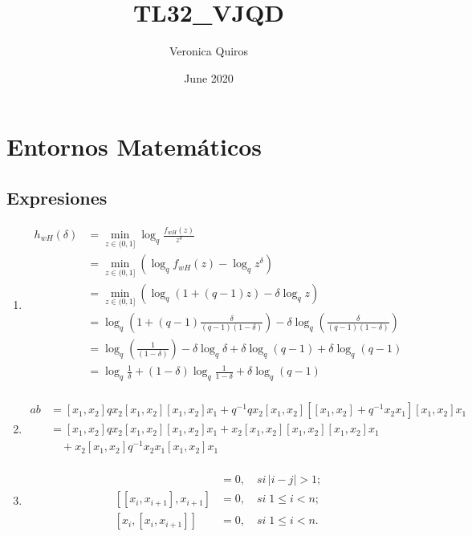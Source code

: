 \documentclass[12pt]{article}
\title{TL32\_VJQD}
\author{Veronica Quiros}
\date{June 2020}
\begin{document}
\maketitle
 \section{Entornos Matem\'aticos}
 \subsection{Expresiones}
 \begin{enumerate}
     \item 
     \begin{align*}
        h_{wH}(\delta)&= \min\limits_{z\in(0,1]} \log_q \frac{f_{wH} (z)}{z^\delta}\\
        & =\min\limits_{z\in(0,1]} (\log_q {f_{wH} (z)}-\log_{q} {z^\delta})\\
        &=\min\limits_{z\in(0,1]}(\log_{q} (1+(q-1)z) -\delta\log_{q} z)\\
        &=\log_{q} \left(1+(q-1)\frac{\delta}{(q-1)(1-\delta)}\right)-\delta\log_{q} \left(\frac{\delta}{(q-1)(1-\delta)}\right)\\
        &=\log_{q} \left(\frac{1}{(1-\delta)}\right) - \delta\log_{q} \delta +\delta\log_{q} (q-1) +\delta\log_{q} (q-1)\\ 
        &=\log_{q} \frac{1}{\delta} +(1-\delta)\log_{q} \frac{1}{1-\delta}+\delta\log_{q} (q-1)\\
     \end{align*}
     \item
     \begin{align*}
         ab&=[x_{1},x_{2}]qx_{2}[x_{1},x_{2}][x_{1},x_{2}]x_{1}+q^{-1}qx_{2}[x_{1},x_{2}][[x_{1},x_{2}]+ q^{-1}x_{2}x_{1}][x_{1},x_{2}]x_{1}\\
         &=[x_{1},x_{2}]qx_{2}[x_{1},x_{2}][x_{1},x_{2}]x_{1}+x_{2}[x_{1},x_{2}][x_{1},x_{2}][x_{1},x_{2}]x_{1}\\
         & \quad+x_{2}[x_{1},x_{2}]q^{-1} x_{2}x_{1}[x_{1},x_{2}]x_{1}\\
     \end{align*}
     \item
     \begin{align}
         [x_{i},x_{j}]&=0, \quad si \, \left| i-j\right| > 1;\\
         [[x_{i},x_{i+1}],x_{i+1} ]&=0, \quad si \; 1 \leq i < n;\\
         [x_{i},[x_{i},x_{i+1}] ]&=0, \quad si \; 1 \leq i < n.

\end{align}
\end{enumerate}
\end{document}
